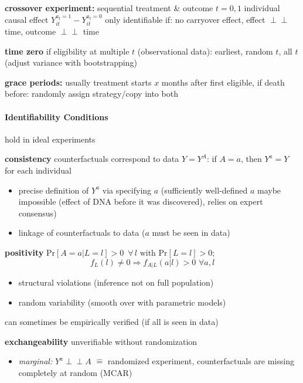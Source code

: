 \documentclass[8pt,twoside]{extarticle}
\newcommand{\indep}{\perp \!\!\! \perp}
\begin{document}
\begin{multicols}{2}
\noindent \textbf{crossover experiment:} sequential treatment \& outcome $t{=}0,1$
\newline
individual causal effect $Y_{it}^{a_t=1} - Y_{it}^{a_t=0}$ only identifiable if: no carryover effect, effect $\indep$ time, outcome $\indep$ time

\noindent \textbf{time zero} if eligibility at multiple $t$ (observational data):
earliest, random $t$, all $t$ (adjust variance with bootstrapping)

\noindent \textbf{grace periods:} usually treatment starts $x$ months after first eligible, if death before: randomly assign strategy/copy into both




\paragraph{Identifiability Conditions} hold in ideal experiments

\noindent \textbf{consistency} counterfactuals correspond to data $Y=Y^A$: \newline
 if $A=a$, then $Y^a=Y$ for each individual
 
\begin{itemize}[itemsep=0em, topsep=0pt, partopsep=0pt,parsep=0pt, leftmargin=1.5em]
\item precise definition of $Y^a$ via specifying $a$ (sufficiently well-defined $a$ maybe impossible (effect of DNA before it was discovered), relies on expert consensus)
\item linkage of counterfactuals to data ($a$ must be seen in data) 
\end{itemize}

\noindent \textbf{positivity} $\mathrm{Pr}\left[A=a|L=l\right] >0 \,\,\, \forall \, l \text{ with } \mathrm{Pr}\left[L=l\right]>0$; $$f_L(l)\neq 0 \Rightarrow f_{A|L}(a|l)>0 \,\, \forall a,l$$

\begin{itemize}[itemsep=0em, topsep=0pt, partopsep=0pt,parsep=0pt, leftmargin=1.5em]
\item structural violations (inference not on full population)
\item random variability (smooth over with parametric models)
\end{itemize}
\noindent can sometimes be empirically verified (if all is seen in data)

\noindent \textbf{exchangeability} unverifiable without randomization
\begin{itemize}[itemsep=0em, topsep=0pt, partopsep=0pt,parsep=0pt, leftmargin=1.5em]
\item \textit{marginal:} $Y^a \indep A$ $\widehat{=}$ randomized experiment, \newline counterfactuals are missing completely at random (MCAR)


\end{itemize}
\end{multicols}
\end{document}
